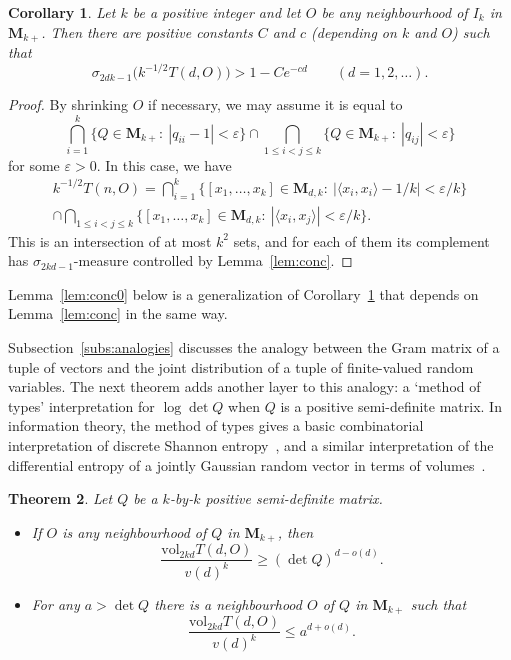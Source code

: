 \documentclass[12pt,a4paper]{article}
\numberwithin{equation}{section}
\newtheorem{thm}{Theorem}[section]
\newtheorem{cor}[thm]{Corollary}
\theoremstyle{remark}
\newcommand{\rmM}{\mathbf{M}}
\newcommand{\eps}{\varepsilon}
\newcommand{\s}{\sigma}
\newcommand{\vol}{\mathrm{vol}}
\begin{document}
\begin{cor}\label{cor:conc}
Let $k$ be a positive integer and let $O$ be any neighbourhood of $I_k$ in $\rmM_{k+}$.  Then there are positive constants $C$ and $c$ (depending on $k$ and $O$) such that
\[\s_{2dk-1}\big(k^{-1/2}T(d,O)\big) > 1 - Ce^{-cd} \qquad (d=1,2,\dots).\]
\end{cor}

\begin{proof}
By shrinking $O$ if necessary, we may assume it is equal to
\[\bigcap_{i=1}^k\{Q \in\rmM_{k+}:\ |q_{ii} - 1| < \eps\}\cap \bigcap_{1\le i < j \le k}\{Q \in \rmM_{k+}:\ |q_{ij}| < \eps\}\]
for some $\eps > 0$. In this case, we have
\begin{multline*}
k^{-1/2}T(n,O) = \bigcap_{i=1}^k\{[x_1,\dots,x_k]\in \rmM_{d,k}:\ |\langle x_i,x_i\rangle - 1/k| < \eps/k\} \\ \cap \bigcap_{1 \le i < j \le k} \{[x_1,\dots,x_k]\in \rmM_{d,k}:\ |\langle x_i,x_j\rangle| < \eps/k\}.
\end{multline*}
This is an intersection of at most $k^2$ sets, and for each of them its complement has $\s_{2kd-1}$-measure controlled by Lemma~\ref{lem:conc}.
\end{proof}

Lemma~\ref{lem:conc0} below is a generalization of Corollary~\ref{cor:conc} that depends on Lemma~\ref{lem:conc} in the same way.

Subsection~\ref{subs:analogies} discusses the analogy between the Gram matrix of a tuple of vectors and the joint distribution of a tuple of finite-valued random variables.  The next theorem adds another layer to this analogy: a `method of types' interpretation for $\log \det Q$ when $Q$ is a positive semi-definite matrix.  In information theory, the method of types gives a basic combinatorial interpretation of discrete Shannon entropy~\cite[Sec. 11.1]{CovTho06}, and a similar interpretation of the differential entropy of a jointly Gaussian random vector in terms of volumes~\cite[Sec. 8.2]{CovTho06}.

\begin{thm}\label{thm:types-1}
	Let $Q$ be a $k$-by-$k$ positive semi-definite matrix.
	\begin{itemize}
		\item[a.] If $O$ is any neighbourhood of $Q$ in $\rmM_{k+}$, then
		\[\frac{\vol_{2kd}T(d,O)}{v(d)^k} \ge  (\det Q)^{d - o(d)}.\]
		\item[b.] For any $a > \det Q$ there is a neighbourhood $O$ of $Q$ in $\rmM_{k+}$ such that
		\[\frac{\vol_{2kd}T(d,O)}{v(d)^k} \le a^{d + o(d)}.\]
	\end{itemize}
\end{thm}
\end{document}
